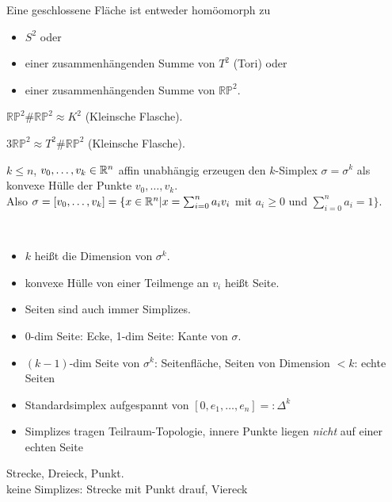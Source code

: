 \begin{satz}
Eine geschlossene Fläche ist entweder homöomorph zu
\begin{itemize}
	\item $S^2$ oder
	\item einer zusammenhängenden Summe von $T^2$ (Tori) oder
	\item einer zusammenhängenden Summe von $\mathbb{RP}^2$.
\end{itemize}
\end{satz}

\begin{lemma}
$\mathbb{RP}^2 \# \mathbb{RP}^2 \approx K^2$ (Kleinsche Flasche).
\end{lemma}

\begin{lemma}
$3 \mathbb{RP}^2 \approx T^2 \# \mathbb{RP}^2 $ (Kleinsche Flasche).
\end{lemma}

\begin{defi}[Simplex]
	$k\le n$, $v_0,\dots,v_k \in \mathbb R^n$ affin unabhängig erzeugen den
	$k$-Simplex $\sigma = \sigma^k$ als konvexe Hülle der Punkte $v_0,\dots,v_k$.\\
	Also $\sigma = [v_0,\dots,v_k] = \{x\in\mathbb R^n | x=\sum_{i=0}^n a_i v_i$ 
	mit $a_i\ge 0$ und $\sum_{i=0}^n a_i = 1\}$.
\end{defi}

\begin{bem}~
	\begin{itemize}
		\item $k$ heißt die Dimension von $\sigma^k$.
		\item konvexe Hülle von einer Teilmenge an $v_i$ heißt Seite.
		\item Seiten sind auch immer Simplizes.
		\item 0-dim Seite: Ecke, 1-dim Seite: Kante von $\sigma$.
		\item $(k-1)$-dim Seite von $\sigma^k$: Seitenfläche, Seiten von Dimension $<k$: echte Seiten
		\item Standardsimplex aufgespannt von $[0, e_1,\dots, e_n] =: \Delta^k$
		\item Simplizes tragen Teilraum-Topologie, innere Punkte liegen \emph{nicht} auf einer echten Seite
	\end{itemize}
\end{bem}

\begin{bsp}[Simplizes]
	Strecke, Dreieck, Punkt.\\
	keine Simplizes: Strecke mit Punkt drauf, Viereck
\end{bsp}

